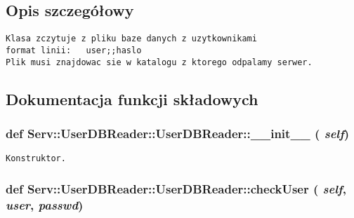 \subsection{Opis szczegółowy}


\footnotesize\begin{verbatim}Klasa zczytuje z pliku baze danych z uzytkownikami
format linii:   user;;haslo
Plik musi znajdowac sie w katalogu z ktorego odpalamy serwer.
\end{verbatim}
\normalsize
 

\subsection{Dokumentacja funkcji składowych}
\hypertarget{class_serv_1_1_user_d_b_reader_1_1_user_d_b_reader_f3811b4b6123fe47153f9d87631322a9}{
\subsubsection[{\_\-\_\-init\_\-\_\-}]{\setlength{\rightskip}{0pt plus 5cm}def Serv::UserDBReader::UserDBReader::\_\-\_\-init\_\-\_\- ( {\em self})}}
\label{class_serv_1_1_user_d_b_reader_1_1_user_d_b_reader_f3811b4b6123fe47153f9d87631322a9}




\footnotesize\begin{verbatim}Konstruktor.\end{verbatim}
\normalsize
 \hypertarget{class_serv_1_1_user_d_b_reader_1_1_user_d_b_reader_1fa47b601f3968090cf56b959f50ca94}{
\subsubsection[{checkUser}]{\setlength{\rightskip}{0pt plus 5cm}def Serv::UserDBReader::UserDBReader::checkUser ( {\em self}, \/   {\em user}, \/   {\em passwd})}}
\label{class_serv_1_1_user_d_b_reader_1_1_user_d_b_reader_1fa47b601f3968090cf56b959f50ca94}




